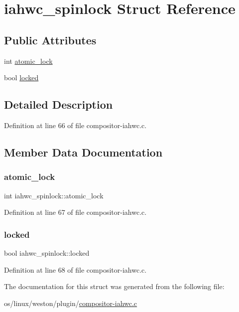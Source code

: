 \hypertarget{structiahwc__spinlock}{}\section{iahwc\+\_\+spinlock Struct Reference}
\label{structiahwc__spinlock}
\subsection*{Public Attributes}
\begin{DoxyCompactItemize}
\item 
int \mbox{\hyperlink{structiahwc__spinlock_a200e6951d15a64341d994bcefcc9f1d8}{atomic\+\_\+lock}}
\item 
bool \mbox{\hyperlink{structiahwc__spinlock_a31f33fe3ff4f8ecbf633363d5d6cdb22}{locked}}
\end{DoxyCompactItemize}


\subsection{Detailed Description}


Definition at line 66 of file compositor-\/iahwc.\+c.



\subsection{Member Data Documentation}
\mbox{\label{structiahwc__spinlock_a200e6951d15a64341d994bcefcc9f1d8}} 
\subsubsection{\texorpdfstring{atomic\+\_\+lock}{atomic\_lock}}
{\footnotesize\ttfamily int iahwc\+\_\+spinlock\+::atomic\+\_\+lock}



Definition at line 67 of file compositor-\/iahwc.\+c.

\mbox{\label{structiahwc__spinlock_a31f33fe3ff4f8ecbf633363d5d6cdb22}} 
\subsubsection{\texorpdfstring{locked}{locked}}
{\footnotesize\ttfamily bool iahwc\+\_\+spinlock\+::locked}



Definition at line 68 of file compositor-\/iahwc.\+c.



The documentation for this struct was generated from the following file\+:\begin{DoxyCompactItemize}
\item 
os/linux/weston/plugin/\mbox{\hyperlink{compositor-iahwc_8c}{compositor-\/iahwc.\+c}}\end{DoxyCompactItemize}
